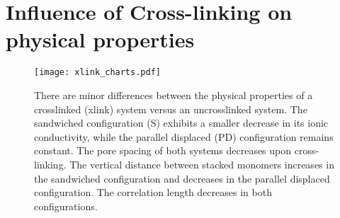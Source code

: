   \clearpage

  \section{Influence of Cross-linking on physical properties}\label{S-section:xlink_physical}
  
  \begin{figure}[!htb]
  \centering
  \texttt{[image: xlink\_charts.pdf]}
  \caption{There are minor differences between the physical properties of a
  crosslinked (xlink) system versus an uncrosslinked system. The sandwiched configuration (S)
  exhibits a smaller decrease in its ionic conductivity, while the parallel displaced (PD)
  configuration remains constant. The pore spacing of both systems decreases upon cross-linking.
  The vertical distance between stacked monomers increases in the sandwiched configuration
  and decreases in the parallel displaced configuration. The correlation length decreases
  in both configurations.}\label{S-fig:xlink}
  \end{figure}
